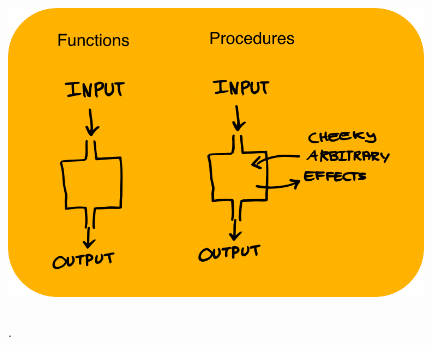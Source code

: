 \begin{titlepage}
    \begin{addmargin}[-1cm]{-3cm}
    \begin{center}
        \large

        \hfill

        \vfill

        \begingroup
            \color{Maroon}\spacedallcaps{\myTitle} \\ \bigskip
        \endgroup

        \spacedlowsmallcaps{\myAuthors}

        \vfill

        \includegraphics[width=11cm]{ext/frontpage2.png} \\ %
		\vfill %
        \mySubtitle \\ %
        \vfill %
        \myMonth \myYear. %

        \vfill

    \end{center}
  \end{addmargin}
\end{titlepage}
